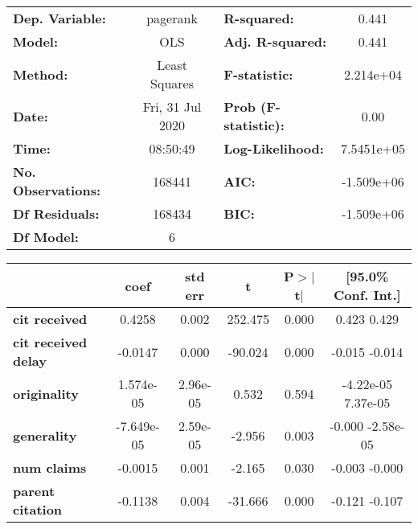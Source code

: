 \begin{center}
\begin{tabular}{lclc}
\toprule
\textbf{Dep. Variable:}     &     pagerank     & \textbf{  R-squared:         } &        0.441     \\
\textbf{Model:}             &       OLS        & \textbf{  Adj. R-squared:    } &        0.441     \\
\textbf{Method:}            &  Least Squares   & \textbf{  F-statistic:       } &    2.214e+04     \\
\textbf{Date:}              & Fri, 31 Jul 2020 & \textbf{  Prob (F-statistic):} &        0.00      \\
\textbf{Time:}              &     08:50:49     & \textbf{  Log-Likelihood:    } &    7.5451e+05    \\
\textbf{No. Observations:}  &      168441      & \textbf{  AIC:               } &    -1.509e+06    \\
\textbf{Df Residuals:}      &      168434      & \textbf{  BIC:               } &    -1.509e+06    \\
\textbf{Df Model:}          &           6      & \textbf{                     } &                  \\
\bottomrule
\end{tabular}
\begin{tabular}{lccccc}
                            & \textbf{coef} & \textbf{std err} & \textbf{t} & \textbf{P$>$$|$t$|$} & \textbf{[95.0\% Conf. Int.]}  \\
\midrule
\textbf{cit received}       &       0.4258  &        0.002     &   252.475  &         0.000        &         0.423     0.429       \\
\textbf{cit received delay} &      -0.0147  &        0.000     &   -90.024  &         0.000        &        -0.015    -0.014       \\
\textbf{originality}        &    1.574e-05  &     2.96e-05     &     0.532  &         0.594        &     -4.22e-05  7.37e-05       \\
\textbf{generality}         &   -7.649e-05  &     2.59e-05     &    -2.956  &         0.003        &        -0.000 -2.58e-05       \\
\textbf{num claims}         &      -0.0015  &        0.001     &    -2.165  &         0.030        &        -0.003    -0.000       \\
\textbf{parent citation}    &      -0.1138  &        0.004     &   -31.666  &         0.000        &        -0.121    -0.107       \\

\end{tabular}
\end{center}
